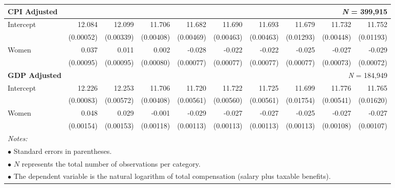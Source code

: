 \begin{table}[h!]
{\begin{tabular}{lrrrrrrrrr}
\textbf{CPI Adjusted} & \multicolumn{9}{r}{\textit{N} = 399,915} \\
\midrule
Intercept & 12.084 & 12.099 & 11.706 & 11.682 & 11.690 & 11.693 & 11.679 & 11.732 & 11.752 \\
 & (0.00052) & (0.00339) & (0.00408) & (0.00469) & (0.00463) & (0.00463) & (0.01293) & (0.00448) & (0.01193) \\
Women & 0.037 & 0.011 & 0.002 & -0.028 & -0.022 & -0.022 & -0.025 & -0.027 & -0.029 \\
 & (0.00095) & (0.00095) & (0.00080) & (0.00077) & (0.00077) & (0.00077) & (0.00077) & (0.00073) & (0.00072) \\
\midrule

\textbf{GDP Adjusted} & \multicolumn{9}{r}{\textit{N} = 184,949} \\
\midrule
Intercept & 12.226 & 12.253 & 11.706 & 11.720 & 11.722 & 11.725 & 11.699 & 11.776 & 11.765 \\
 & (0.00083) & (0.00572) & (0.00408) & (0.00561) & (0.00560) & (0.00561) & (0.01754) & (0.00541) & (0.01620) \\
Women & 0.048 & 0.029 & -0.001 & -0.029 & -0.027 & -0.027 & -0.025 & -0.027 & -0.027 \\
 & (0.00154) & (0.00153) & (0.00118) & (0.00113) & (0.00113) & (0.00113) & (0.00113) & (0.00108) & (0.00107) \\
\midrule
\bottomrule
\multicolumn{10}{l}{\footnotesize \textit{Notes:}} \\
\multicolumn{10}{l}{\footnotesize $\bullet$ Standard errors in parentheses.} \\
\multicolumn{10}{l}{\footnotesize $\bullet$ $N$ represents the total number of observations per category.} \\
\multicolumn{10}{l}{\footnotesize $\bullet$ The dependent variable is the natural logarithm of total compensation (salary plus taxable benefits).} 
\end{tabular}
}
\end{table}
